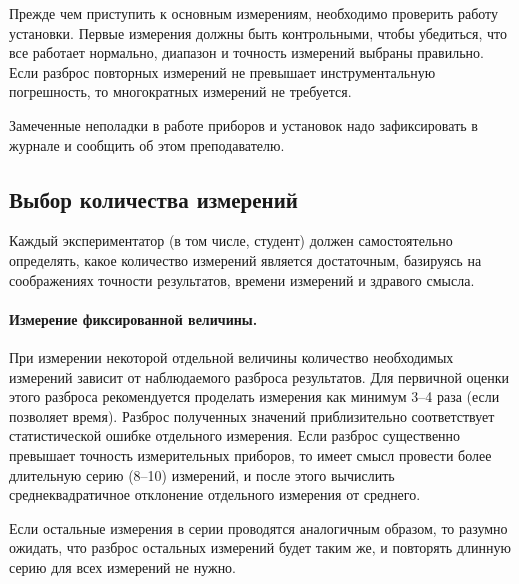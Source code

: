 
Прежде чем приступить к основным измерениям, необходимо проверить
работу установки. Первые измерения должны быть контрольными, чтобы
убедиться, что все работает нормально, диапазон и точность измерений
выбраны правильно. Если разброс повторных измерений не превышает
инструментальную погрешность, то многократных измерений не требуется.

Замеченные неполадки в работе приборов и установок надо зафиксировать в журнале
и сообщить об этом преподавателю.

\subsection{Выбор количества измерений}

Каждый экспериментатор
(в том числе, студент) должен самостоятельно определять, какое количество
измерений является достаточным, базируясь на соображениях точности результатов,
времени измерений и здравого смысла.


\paragraph{Измерение фиксированной величины.}
При измерении некоторой отдельной величины количество необходимых измерений
зависит от наблюдаемого разброса результатов. Для первичной оценки этого разброса
рекомендуется проделать измерения как минимум 3--4 раза (если позволяет время).
Разброс полученных значений приблизительно соответствует
статистической ошибке отдельного измерения. Если разброс существенно превышает
точность измерительных приборов, то имеет смысл провести более длительную серию (8--10) измерений, и после этого вычислить среднеквадратичное отклонение отдельного измерения от среднего.

Если остальные измерения в серии проводятся аналогичным образом,
то разумно ожидать, что разброс остальных измерений будет таким же,
и повторять длинную серию  для всех измерений не нужно.

